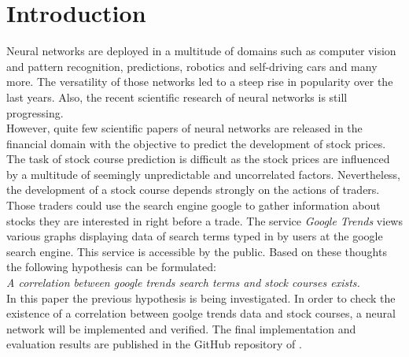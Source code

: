 \section{Introduction}
\label{sec:introduction}
Neural networks are deployed in a multitude of domains such as computer vision and pattern recognition, predictions, robotics and self-driving cars and many more. The versatility of those networks led to a steep rise in popularity over the last years. Also, the recent scientific research of neural networks is still progressing. 
\\
However, quite few scientific papers of neural networks are released in the financial domain with the objective to predict the development of stock prices. The task of stock course prediction is difficult as the stock prices are influenced by a multitude of seemingly unpredictable and uncorrelated factors. Nevertheless, the development of a stock course depends strongly on the actions of traders. Those traders could use the search engine google to gather information about stocks they are interested in right before a trade. The service \textit{Google Trends} views various graphs displaying data of search terms typed in by users at the google search engine. This service is accessible by the public. Based on these thoughts the following hypothesis can be formulated: 
\\
\textit{A correlation between google trends search terms and stock courses exists. } 
\\
In this paper the previous hypothesis is being investigated. In order to check the existence of a correlation between goolge trends data and stock courses, a neural network will be implemented and verified. The final implementation and evaluation results are published in the GitHub repository of \cite{githubrepo}. 
